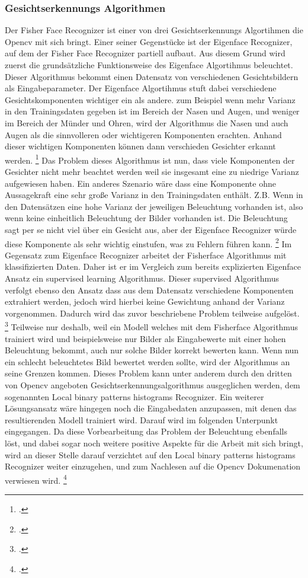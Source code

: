 \documentclass[12pt, a4paper]{report}
\begin{document}
\subsubsection{Gesichtserkennungs Algorithmen}
Der Fisher Face Recognizer ist einer von drei Gesichtserkennungs Algortihmen die Opencv mit sich bringt. Einer seiner Gegenstücke ist der Eigenface Recognizer, auf dem der Fisher Face Recognizer partiell aufbaut. Aus diesem Grund wird zuerst die grundsätzliche Funktionsweise des Eigenface Algortihmus beleuchtet. Dieser Algorithmus bekommt einen Datensatz von verschiedenen Gesichtsbildern als Eingabeparameter. Der Eigenface Algortihmus stuft dabei verschiedene Gesichtskomponenten wichtiger ein als andere. zum Beispiel wenn mehr Varianz in den Trainingsdaten gegeben ist im Bereich der Nasen und Augen, und weniger im Bereich der Münder und Ohren,  wird der Algorithmus die Nasen und auch Augen als die sinnvolleren oder wichtigeren Komponenten erachten. Anhand dieser wichtigen Komponenten können dann verschieden Gesichter erkannt werden.
\footcite[Vgl.][]{Eigenface}
Das Problem dieses Algorithmus ist nun, dass viele Komponenten der Gesichter nicht mehr beachtet werden weil sie insgesamt eine zu niedrige Varianz aufgewiesen haben. Ein anderes Szenario wäre dass eine Komponente ohne Aussagekraft eine sehr große Varianz in den Trainingsdaten enthält. Z.B. Wenn in den Datensätzen eine hohe Varianz der jeweiligen Beleuchtung vorhanden ist, also wenn keine einheitlich Beleuchtung der Bilder vorhanden ist. Die Beleuchtung sagt per se nicht viel über ein Gesicht aus, aber der Eigenface Recognizer würde diese Komponente als sehr wichtig einstufen, was zu Fehlern führen kann.
\footcite[Vgl.][]{Fisherface}
Im Gegensatz zum Eigenface Recognizer arbeitet der Fisherface Algorithmus mit klassifizierten Daten. Daher ist er im Vergleich zum bereits explizierten Eigenface Ansatz ein supervised learning Algorithmus. Dieser supervised Algorithmus verfolgt ebenso den Ansatz dass aus dem Datensatz verschiedene Komponenten extrahiert werden, jedoch wird hierbei keine Gewichtung anhand der Varianz vorgenommen. Dadurch wird das zuvor beschriebene Problem teilweise aufgelöst. 
\footcite[Vgl.][How to fix this issue]{Eigenface}
Teilweise nur deshalb, weil ein Modell welches mit dem Fisherface Algorithmus trainiert wird und beispielsweise nur Bilder als Eingabewerte mit einer hohen Beleuchtung bekommt, auch nur solche Bilder korrekt bewerten kann. Wenn nun ein schlecht beleuchtetes Bild bewertet werden sollte, wird der Algorithmus an seine Grenzen kommen.
Dieses Problem kann unter anderem durch den dritten von Opencv angeboten Gesichtserkennungsalgorithmus ausgeglichen werden, dem sogenannten Local binary patterns histograms Recognizer. Ein weiterer Lösungsansatz wäre hingegen noch die Eingabedaten anzupassen, mit denen das resultierenden Modell trainiert wird. Darauf wird im folgenden Unterpunkt \pageref{subsec: Eingabe Daten} eingegangen. Da diese Vorbearbeitung das Problem der Beleuchtung ebenfalls löst, und dabei sogar noch weitere positive Aspekte für die Arbeit mit sich bringt, wird an dieser Stelle darauf verzichtet auf den Local binary patterns histograms Recognizer weiter einzugehen, und zum Nachlesen auf die Opencv Dokumenation verwiesen wird. 
\footcite[Vgl.][]{Recognizer} 
\end{document}
